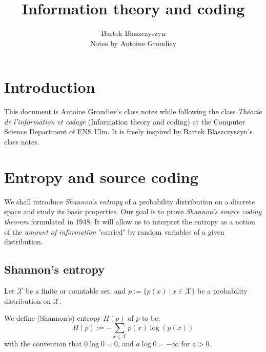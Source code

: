 \documentclass{../cs-classes/cs-classes}
\title{Information theory and coding}
\author{Bartek Blaszczyszyn\\ Notes by Antoine Groudiev}
\begin{document}
\section*{Introduction}
This document is Antoine Groudiev's class notes while following the class \emph{Théorie de l'information et codage} (Information theory and coding) at the Computer Science Department of ENS Ulm. It is freely inspired by Bartek Blaszczyszyn's class notes. 

\section{Entropy and source coding}
We shall introduce \emph{Shannon’s entropy} of a probability distribution on a discrete space and study its basic properties. Our goal is to prove \emph{Shannon’s source coding theorem} formulated in 1948. It will allow us to interpret the entropy as a notion of the \emph{amount of information} "carried" by random variables of a given distribution.

\subsection{Shannon's entropy}
Let $\mathcal{X}$ be a finite or countable set, and $p := \{p(x) \: | \: x\in \mathcal{X} \}$ be a probability distribution on $\mathcal{X}$.

\begin{definition} We define (Shannon's) entropy $H(p)$ of $p$ to be:
\begin{equation}
    H(p) := -\sum_{x\in\mathcal{X}}p(x)\log(p(x))
\end{equation}
with the convention that $0\log 0 = 0$, and $a\log 0 = -\infty$ for $a>0$.
    
\end{definition}
\end{document}

